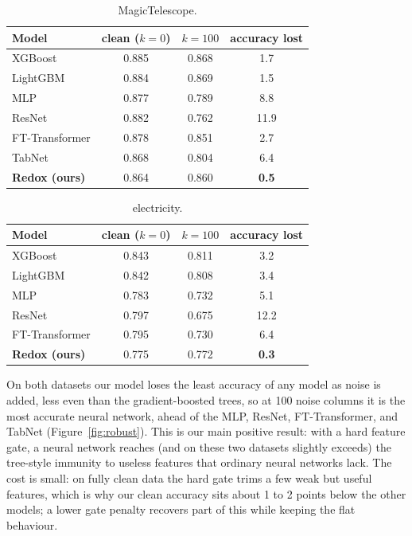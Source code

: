 \documentclass[11pt]{article}
\begin{document}
\begin{table}[h]\centering
\begin{tabular}{lccc}
\toprule
Model & clean ($k{=}0$) & $k{=}100$ & accuracy lost \\
\midrule
XGBoost & 0.885 & 0.868 & 1.7 \\
LightGBM & 0.884 & 0.869 & 1.5 \\
MLP & 0.877 & 0.789 & 8.8 \\
ResNet & 0.882 & 0.762 & 11.9 \\
FT-Transformer & 0.878 & 0.851 & 2.7 \\
TabNet & 0.868 & 0.804 & 6.4 \\
\textbf{Redox (ours)} & 0.864 & 0.860 & \textbf{0.5} \\
\bottomrule
\end{tabular}
\caption{MagicTelescope.}
\end{table}

\begin{table}[h]\centering
\begin{tabular}{lccc}
\toprule
Model & clean ($k{=}0$) & $k{=}100$ & accuracy lost \\
\midrule
XGBoost & 0.843 & 0.811 & 3.2 \\
LightGBM & 0.842 & 0.808 & 3.4 \\
MLP & 0.783 & 0.732 & 5.1 \\
ResNet & 0.797 & 0.675 & 12.2 \\
FT-Transformer & 0.795 & 0.730 & 6.4 \\
\textbf{Redox (ours)} & 0.775 & 0.772 & \textbf{0.3} \\
\bottomrule
\end{tabular}
\caption{electricity.}
\end{table}

On both datasets our model loses the least accuracy of any model as noise is added, less even
than the gradient-boosted trees, so at 100 noise columns it is the most accurate neural
network, ahead of the MLP, ResNet, FT-Transformer, and TabNet (Figure~\ref{fig:robust}). This
is our main positive result: with a hard feature gate, a neural network reaches (and on these
two datasets slightly exceeds) the tree-style immunity to useless features that ordinary
neural networks lack. The cost is small: on fully clean data the hard gate trims a few weak
but useful features, which is why our clean accuracy sits about 1 to 2 points below the other
models; a lower gate penalty recovers part of this while keeping the flat behaviour.
\end{document}
